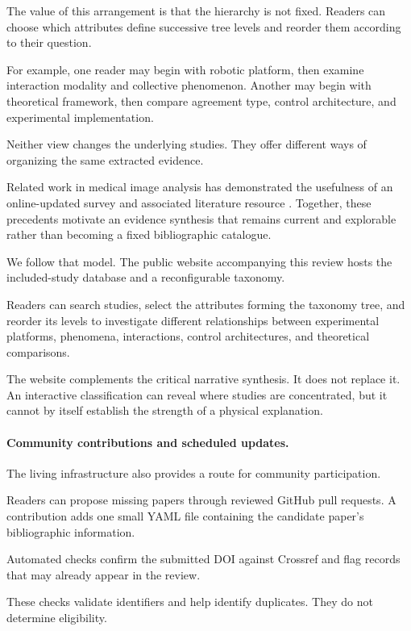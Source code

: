 The value
of this arrangement
is that the
hierarchy is
not fixed.
Readers can
choose which
attributes define
successive tree
levels and
reorder them
according to
their question.

For example,
one reader may
begin with
robotic platform,
then examine
interaction modality
and collective
phenomenon.
Another may
begin with
theoretical framework,
then compare
agreement type,
control architecture,
and experimental
implementation.

Neither view
changes the
underlying studies.
They offer
different ways
of organizing
the same
extracted evidence.

Related work
in medical
image analysis
has demonstrated
the usefulness
of an online-updated
survey and
associated
literature resource
\cite{Litjens2017survey}.
Together, these
precedents motivate
an evidence synthesis
that remains
current and
explorable rather
than becoming
a fixed
bibliographic
catalogue.

We follow
that model.
The public
website accompanying
this review
hosts the
included-study
database and
a reconfigurable
taxonomy.

Readers can
search studies,
select the
attributes forming
the taxonomy
tree, and
reorder its
levels to
investigate
different relationships
between experimental
platforms,
phenomena,
interactions,
control architectures,
and theoretical
comparisons.

The website
complements
the critical
narrative synthesis.
It does not
replace it.
An interactive
classification
can reveal
where studies
are concentrated,
but it cannot
by itself
establish the
strength of
a physical
explanation.

\paragraph*{Community contributions and scheduled updates.}

The living infrastructure
also provides
a route for
community participation.

Readers can
propose missing
papers through
reviewed GitHub
pull requests.
A contribution
adds one small
YAML file
containing the
candidate paper's
bibliographic
information.

Automated checks
confirm the
submitted DOI
against Crossref
and flag
records that
may already
appear in
the review.

These checks
validate identifiers
and help
identify duplicates.
They do not
determine eligibility.

